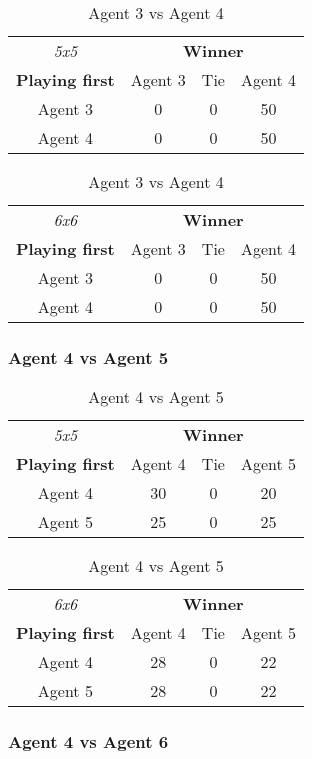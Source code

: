 \begin{table}[!h]
	\centering
	\label{result:Ag3vsAg4}
	\begin{tabular}{c | c | c | c}
		\textit{5x5} & \multicolumn{3}{c}{\textbf{Winner}}        \\
		\textbf{Playing first} & Agent 3 & Tie & Agent 4 \\ \hline
		Agent 3 & 0 & 0 & 50 \\ \hline
		Agent 4 & 0 & 0 & 50
	\end{tabular}
	\quad
	\begin{tabular}{c | c | c | c}
		\textit{6x6} & \multicolumn{3}{c}{\textbf{Winner}}        \\
		\textbf{Playing first} & Agent 3 & Tie & Agent 4 \\ \hline
		Agent 3 & 0 & 0 & 50 \\ \hline
		Agent 4 & 0 & 0 & 50
	\end{tabular}
	\caption{Agent 3 vs Agent 4}
\end{table}


\subsubsection{Agent 4 vs Agent 5}

\begin{table}[!h]
	\centering
	\label{result:Ag4vsAg5}
	\begin{tabular}{c | c | c | c}
		\textit{5x5} & \multicolumn{3}{c}{\textbf{Winner}}        \\
		\textbf{Playing first} & Agent 4 & Tie & Agent 5 \\ \hline
		Agent 4 & 30 & 0 & 20 \\ \hline
		Agent 5 & 25 & 0 & 25
	\end{tabular}
	\quad
	\begin{tabular}{c | c | c | c}
		\textit{6x6} & \multicolumn{3}{c}{\textbf{Winner}}        \\
		\textbf{Playing first} & Agent 4 & Tie & Agent 5 \\ \hline
		Agent 4 & 28 & 0 & 22 \\ \hline
		Agent 5 & 28 & 0 & 22
	\end{tabular}
	\caption{Agent 4 vs Agent 5}
\end{table}


\subsubsection{Agent 4 vs Agent 6}


